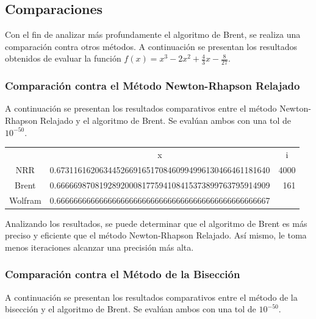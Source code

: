 \documentclass[a4paper,12pt]{article}
\begin{document}
\newpage 

\subsection{Comparaciones}

Con el fin de analizar más profundamente el algoritmo de Brent, se realiza una comparación contra otros métodos. A continuación se presentan los resultados obtenidos de evaluar la función $f(x)=x^3-2x^2+\frac{4}{3}x-\frac{8}{27}$. \par

\subsubsection{Comparación contra el Método Newton-Rhapson Relajado}

A continuación se presentan los resultados comparativos entre el método Newton-Rhapson Relajado y el algoritmo de Brent. Se evalúan ambos con una tol de $10^{-50}$. \par

\begin{table}[ht!]
\begin{tabular}{crr}
        & \multicolumn{1}{c}{x}                                & \multicolumn{1}{c}{i} \\
NRR     & 0.67311616206344526691651708460994996130466461181640 & 4000                  \\
Brent   & 0.66666987081928920008177594108415373899763795914909 & 161                   \\
Wolfram & 0.66666666666666666666666666666666666666666666666667 & \multicolumn{1}{l}{} 
\end{tabular}
\end{table}

Analizando los resultados, se puede determinar que el algoritmo de Brent es más preciso y eficiente que el método Newton-Rhapson Relajado. Así mismo, le toma menos iteraciones alcanzar una precisión más alta. \par

\subsubsection{Comparación contra el Método de la Bisección}

A continuación se presentan los resultados comparativos entre el método de la bisección y el algoritmo de Brent. Se evalúan ambos con una tol de $10^{-50}$. \par
\end{document}

